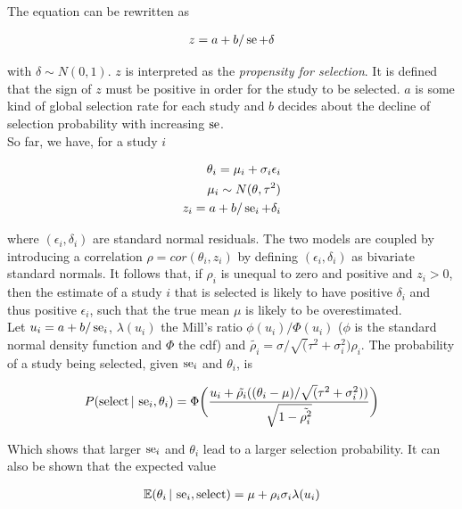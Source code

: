 \documentclass[11pt,a4paper,twoside]{book}\usepackage[]{graphicx}\usepackage[]{color}
\begin{document}
The equation can be rewritten as 

\begin{align}
z = a + b/\se + \delta \nonumber %
\end{align}

with $\delta \sim N(0,1)$. $z$ is interpreted as the \textit{propensity for selection}. It is defined that the sign of $z$ must be positive in order for the study to be selected.
$a$ is some kind of global selection rate for each study and $b$ decides about the decline of selection probability with increasing $\operatorname{se}$.\\
So far, we have, for a study $i$

\begin{align}
\theta_i = \mu_i + \sigma_i\epsilon_i \nonumber \\ 
\mu_i \sim N(\theta, \tau^2) \nonumber \\
z_i = a + b/\operatorname{se}_i + \delta_i \nonumber
\end{align}

where $(\epsilon_i, \delta_i)$ are standard normal residuals. The two models are coupled by introducing a correlation $\rho = cor(\theta_i, z_i)$ by defining $(\epsilon_i, \delta_i)$ as bivariate standard normals. It follows that,
if $\rho_i$ is unequal to zero and positive and $z_i > 0$, then the estimate of a study $i$ that is selected is likely to have positive $\delta_i$ and thus positive $\epsilon_i$, such that the true mean $\mu$ is likely to be overestimated. \\
Let $u_i = a + b/\operatorname{se}_i$, $\lambda(u_i)$ the Mill's ratio $\phi(u_i)/\Phi(u_i)$ ($\phi$ is the standard normal density function and $\Phi$ the cdf) and $\tilde{\rho_i} = \sigma/\sqrt(\tau^2 + \sigma_i^2) \rho_i$. The probability of a study being selected, given $\operatorname{se}_i$ and $\theta_i$, is

\begin{align}
P(\textrm{select} \given \se_i, \theta_i) = %
\Phi\bigg(\frac{u_i + \tilde{\rho_i}((\theta_i - \mu)/\sqrt(\tau^2 + \sigma_i^2))}{\sqrt{1 - \tilde{\rho_i^2}}}\bigg) \nonumber
\end{align}

Which shows that larger $\operatorname{se}_i$ and $\theta_i$ lead to a larger selection probability. It can also be shown that the expected value 

\begin{align}
\mathbb{E}(\theta_i \,\vert\, \operatorname{se}_i, \textrm{select}) = \mu + \rho_i\sigma_i\lambda(u_i) \label{eq:copas.expectation}
\end{align}
\end{document}
